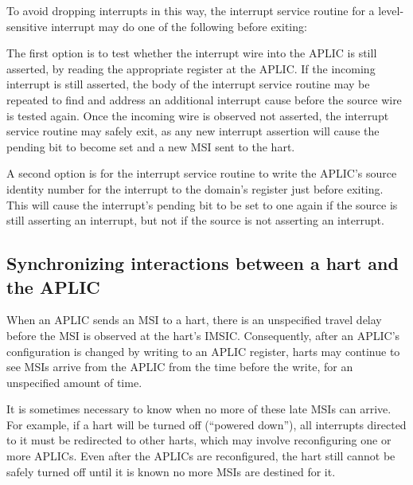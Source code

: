 To avoid dropping interrupts in this way, the interrupt service routine
for a level-sensitive interrupt may do one of the following before
exiting:

The first option is to test whether the interrupt wire into the APLIC
is still asserted, by reading the appropriate  register at
the APLIC.
If the incoming interrupt is still asserted, the body of the interrupt
service routine may be repeated to find and address an additional
interrupt cause before the source wire is tested again.
Once the incoming wire is observed not asserted, the interrupt service
routine may safely exit, as any new interrupt assertion will cause the
pending bit to become set and a new MSI sent to the hart.

A second option is for the interrupt service routine to write the
APLIC's source identity number for the interrupt to the domain's
 register just before exiting.
This will cause the interrupt's pending bit to be set to one again if
the source is still asserting an interrupt, but not if the source is
not asserting an interrupt.

\subsection{Synchronizing interactions between a hart and the APLIC}
\label{sec:AdvPLIC-MSISync}

When an APLIC sends an MSI to a hart, there is an unspecified travel
delay before the MSI is observed at the hart's IMSIC.
Consequently, after an APLIC's configuration is changed by writing to an
APLIC register, harts may continue to see MSIs arrive from the APLIC from
the time before the write, for an unspecified amount of time.

It is sometimes necessary to know when no more of these late MSIs can
arrive.
For example, if a hart will be turned off (``powered down''), all
interrupts directed to it must be redirected to other harts, which may
involve reconfiguring one or more APLICs.
Even after the APLICs are reconfigured, the hart still cannot be safely
turned off until it is known no more MSIs are destined for it.

